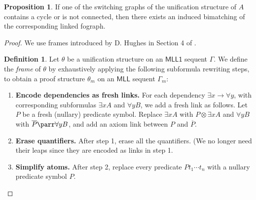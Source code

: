 \documentclass[conference]{IEEEtran}
\theoremstyle{definition}
\newtheorem{definition}[thm]{Definition}
\newtheorem{proposition}[thm]{Proposition}
\newcommand*{\MLL}{\mathsf{MLL}}
\newcommand*{\FOMLL}{\mathsf{MLL1}}
\begin{document}
\begin{proposition}
If one of the switching graphs of the unification structure of $A$
contains a cycle or is not connected, then there exists an induced bimatching of the
corresponding linked fograph.
\begin{proof}
We use frames introduced by D. Hughes in Section 4 of \cite{Hughes 2015}.

\begin{definition}
Let $\theta$ be a unification structure on an $\FOMLL$ sequent $\Gamma$.
We define the \textit{frame}  of $\theta$ by exhaustively applying the following subformula rewriting steps, to obtain a proof structure $\theta_m$ on an $\MLL$ sequent $\Gamma_m$:

\begin{enumerate}
  \item {\bf Encode dependencies as fresh links.} For each dependency $\exists x \rightarrow \forall y$, with corresponding subformulas $\exists x A$ and $\forall y B$, we add a fresh link as follows. Let $P$ be a fresh (nullary) predicate symbol. Replace $\exists x A$ with $P \otimes \exists x A$ and $\forall y B$ with $\overline{P} \parr \forall y B$, and add an axiom link between $P$ and $\overline{P}$.
  \item {\bf Erase quantifiers.} After step 1, erase all the quantifiers. (We no longer need their leaps since they are encoded as links in step 1.
  \item {\bf Simplify atoms.} After step 2, replace every predicate $Pt_1 \cdots t_n$ with a nullary predicate symbol $P$.
\end{enumerate}
\end{definition}

\begin{center}
\vspace{0.5cm}


\end{center}
\end{proof}
\end{proposition}
\end{document}
